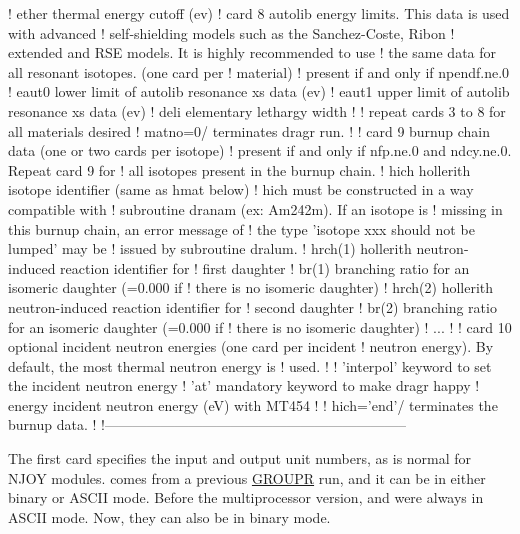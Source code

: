 \begin{ccode}
   !   ether     thermal energy cutoff (ev)
   ! card 8 autolib energy limits. This data is used with advanced
   !        self-shielding models such as the Sanchez-Coste, Ribon
   !        extended and RSE models. It is highly recommended to use
   !        the same data for all resonant isotopes. (one card per
   !        material)
   ! present if and only if npendf.ne.0
   !   eaut0     lower limit of autolib resonance xs data (ev)
   !   eaut1     upper limit of autolib resonance xs data (ev)
   !   deli      elementary lethargy width
   !
   !            repeat cards 3 to 8 for all materials desired
   !            matno=0/ terminates dragr run.
   !
   ! card 9 burnup chain data (one or two cards per isotope)
   ! present if and only if nfp.ne.0 and ndcy.ne.0. Repeat card 9 for
   ! all isotopes present in the burnup chain.
   !   hich      hollerith isotope identifier (same as hmat below)
   !             hich must be constructed in a way compatible with
   !             subroutine dranam (ex: Am242m). If an isotope is
   !             missing in this burnup chain, an error message of
   !             the type 'isotope xxx should not be lumped' may be
   !             issued by subroutine dralum.
   !   hrch(1)   hollerith neutron-induced reaction identifier for
   !             first daughter
   !   br(1)     branching ratio for an isomeric daughter (=0.000 if
   !             there is no isomeric daughter)
   !   hrch(2)   hollerith neutron-induced reaction identifier for
   !             second daughter
   !   br(2)     branching ratio for an isomeric daughter (=0.000 if
   !             there is no isomeric daughter)
   !  ...
   !
   ! card 10 optional incident neutron energies (one card per incident
   ! neutron energy). By default, the most thermal neutron energy is
   ! used.
   !
   !  'interpol' keyword to set the incident neutron energy
   !  'at'       mandatory keyword to make dragr happy
   !   energy    incident neutron energy (eV) with MT454
   !
   ! hich='end'/ terminates the burnup data.
   !
   !-----------------------------------------------------------------

\end{ccode}
\normalsize

The first card specifies the input and output unit numbers, as
is normal for NJOY modules.   comes from a previous
\hyperlink{sGROUPRhy}{GROUPR} run, and it can be in
either binary or ASCII mode.
Before the multiprocessor version,  and 
were always in ASCII mode. Now, they can also be in binary mode.

